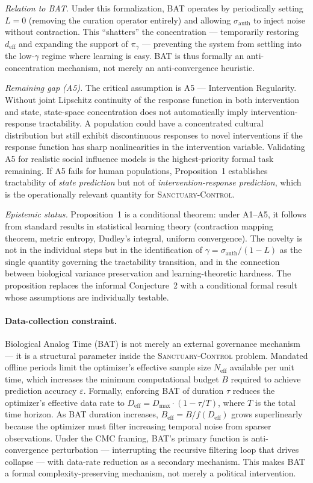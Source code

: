 \documentclass[11pt, a4paper]{article}
\theoremstyle{remark}
\newcommand{\SC}{\textsc{Sanctuary-Control}}
\begin{document}
\emph{Relation to BAT.} Under this formalization, BAT operates by periodically setting $L = 0$ (removing the curation operator entirely) and allowing $\sigma_{\text{auth}}$ to inject noise without contraction. This ``shatters'' the concentration --- temporarily restoring $d_{\text{eff}}$ and expanding the support of $\pi_\gamma$ --- preventing the system from settling into the low-$\gamma$ regime where learning is easy. BAT is thus formally an anti-concentration mechanism, not merely an anti-convergence heuristic.

\emph{Remaining gap (A5).} The critical assumption is A5 --- Intervention Regularity. Without joint Lipschitz continuity of the response function in both intervention and state, state-space concentration does not automatically imply intervention-response tractability. A population could have a concentrated cultural distribution but still exhibit discontinuous responses to novel interventions if the response function has sharp nonlinearities in the intervention variable. Validating A5 for realistic social influence models is the highest-priority formal task remaining. If A5 fails for human populations, Proposition~1 establishes tractability of \emph{state prediction} but not of \emph{intervention-response prediction}, which is the operationally relevant quantity for \SC{}.

\emph{Epistemic status.} Proposition~1 is a conditional theorem: under A1--A5, it follows from standard results in statistical learning theory (contraction mapping theorem, metric entropy, Dudley's integral, uniform convergence). The novelty is not in the individual steps but in the identification of $\gamma = \sigma_{\text{auth}} / (1 - L)$ as the single quantity governing the tractability transition, and in the connection between biological variance preservation and learning-theoretic hardness. The proposition replaces the informal Conjecture~2 with a conditional formal result whose assumptions are individually testable.

\paragraph{Data-collection constraint.} Biological Analog Time (BAT) is not merely an external governance mechanism --- it is a structural parameter inside the \SC{} problem. Mandated offline periods limit the optimizer's effective sample size $N_{\text{eff}}$ available per unit time, which increases the minimum computational budget $B$ required to achieve prediction accuracy $\varepsilon$. Formally, enforcing BAT of duration $\tau$ reduces the optimizer's effective data rate to $D_{\text{eff}} = D_{\max} \cdot (1 - \tau/T)$, where $T$ is the total time horizon. As BAT duration increases, $B_{\text{eff}} = B / f(D_{\text{eff}})$ grows superlinearly because the optimizer must filter increasing temporal noise from sparser observations. Under the CMC framing, BAT's primary function is anti-convergence perturbation --- interrupting the recursive filtering loop that drives collapse --- with data-rate reduction as a secondary mechanism. This makes BAT a formal complexity-preserving mechanism, not merely a political intervention.
\end{document}
